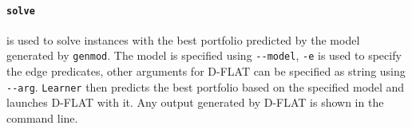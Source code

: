\paragraph{\lstinline$solve$}
is used to solve instances with the best portfolio predicted by the model generated by \lstinline$genmod$. The model is specified using \lstinline$--model$, \lstinline$-e$ is used to specify the edge predicates, other arguments for D-FLAT can be specified as string using \lstinline$--arg$.
\lstinline$Learner$ then predicts the best portfolio based on the specified model and launches D-FLAT with it. Any output generated by D-FLAT is shown in the command line.



